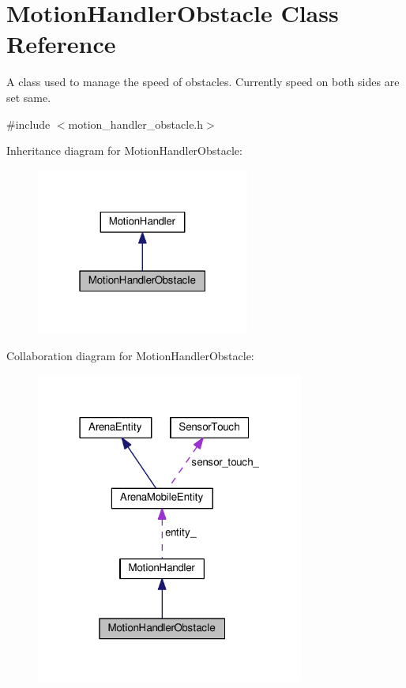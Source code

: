 \hypertarget{classMotionHandlerObstacle}{}\section{Motion\+Handler\+Obstacle Class Reference}
\label{classMotionHandlerObstacle}


A class used to manage the speed of obstacles. Currently speed on both sides are set same.  




{\ttfamily \#include $<$motion\+\_\+handler\+\_\+obstacle.\+h$>$}



Inheritance diagram for Motion\+Handler\+Obstacle\+:\nopagebreak
\begin{figure}[H]
\begin{center}
\leavevmode
\includegraphics[width=199pt]{classMotionHandlerObstacle__inherit__graph}
\end{center}
\end{figure}


Collaboration diagram for Motion\+Handler\+Obstacle\+:\nopagebreak
\begin{figure}[H]
\begin{center}
\leavevmode
\includegraphics[width=250pt]{classMotionHandlerObstacle__coll__graph}
\end{center}
\end{figure}
